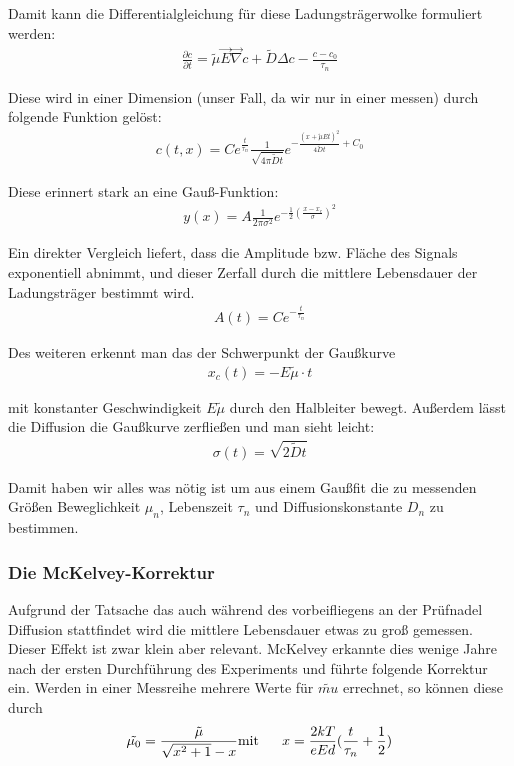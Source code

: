 \documentclass[12pt]{article}
\begin{document}
Damit kann die Differentialgleichung für diese Ladungsträgerwolke formuliert werden:
\begin{align}
\frac{\partial c}{\partial t} = \tilde{\mu}\vec{E}\vec{\nabla}c + \tilde{D}\Delta c -\frac{c-c_0}{\tau_n}
\end{align}

Diese wird in einer Dimension (unser Fall, da wir nur in einer messen) durch folgende Funktion gelöst:
\begin{align}
c(t,x) = C e^{\frac{t}{\tau_n}} \frac{1}{\sqrt{4\pi\tilde{D}t}} e^{-\frac{(x+\tilde{\mu}Et)^2}{4\tilde{D}t}+C_0}
\end{align}

Diese erinnert stark an eine Gauß-Funktion:
\begin{align}
y(x)=A \frac{1}{2\pi\sigma^2}e^{-\frac{1}{2}(\frac{x-x_c}{\sigma})^2}
\end{align}

Ein direkter Vergleich liefert, dass die Amplitude bzw. Fläche des Signals exponentiell abnimmt, und dieser Zerfall durch die mittlere Lebensdauer der Ladungsträger bestimmt wird.
\begin{align}
A(t)=Ce^{-\frac{t}{\tau_n}}
\end{align}

Des weiteren erkennt man das der Schwerpunkt der Gaußkurve 
\begin{align}
x_c(t)=-E\tilde{\mu} \cdot t
\end{align}

mit konstanter Geschwindigkeit $E\tilde{\mu}$ durch den Halbleiter bewegt. Außerdem lässt die Diffusion die Gaußkurve zerfließen und man sieht leicht:
\begin{align}
\sigma(t)= \sqrt{2\tilde{D}t}
\end{align}

Damit haben wir alles was nötig ist um aus einem Gaußfit die zu messenden Größen Beweglichkeit $\mu_n$, Lebenszeit $\tau_n$ und Diffusionskonstante $D_n$ zu bestimmen.

\subsubsection{Die McKelvey-Korrektur}

Aufgrund der Tatsache das auch während des vorbeifliegens an der Prüfnadel Diffusion stattfindet wird die mittlere Lebensdauer etwas zu groß gemessen. Dieser Effekt ist zwar klein aber relevant. McKelvey erkannte dies wenige Jahre nach der ersten Durchführung des Experiments und führte folgende Korrektur ein. Werden in einer Messreihe mehrere Werte für $\tilde{mu}$ errechnet, so können diese durch
\begin{align}
 \tilde{\mu_0}=\frac{\tilde{\mu}}{\sqrt{x^2+1}-x} \textnormal{mit} ~~~~~x=\frac{2kT}{eEd}(\frac{t}{\tau_n}+\frac{1}{2})
\end{align}
\end{document}
